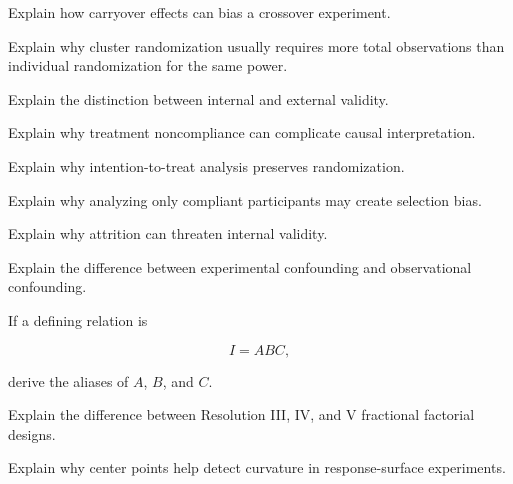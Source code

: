 \begin{exercise}[3]
Explain how carryover effects can bias a crossover experiment.
\end{exercise}

\begin{exercise}[3]
Explain why cluster randomization usually requires more total
observations than individual randomization for the same power.
\end{exercise}

\begin{exercise}[3]
Explain the distinction between internal and external validity.
\end{exercise}

\begin{exercise}[3]
Explain why treatment noncompliance can complicate causal interpretation.
\end{exercise}

\begin{exercise}[3]
Explain why intention-to-treat analysis preserves randomization.
\end{exercise}

\begin{exercise}[3]
Explain why analyzing only compliant participants may create selection
bias.
\end{exercise}

\begin{exercise}[3]
Explain why attrition can threaten internal validity.
\end{exercise}

\begin{exercise}[3]
Explain the difference between experimental confounding and observational
confounding.
\end{exercise}

\begin{exercise}[3]
If a defining relation is

\[
I=ABC,
\]

derive the aliases of \(A\), \(B\), and \(C\).
\end{exercise}

\begin{exercise}[3]
Explain the difference between Resolution III, IV, and V fractional
factorial designs.
\end{exercise}

\begin{exercise}[3]
Explain why center points help detect curvature in response-surface
experiments.
\end{exercise}

